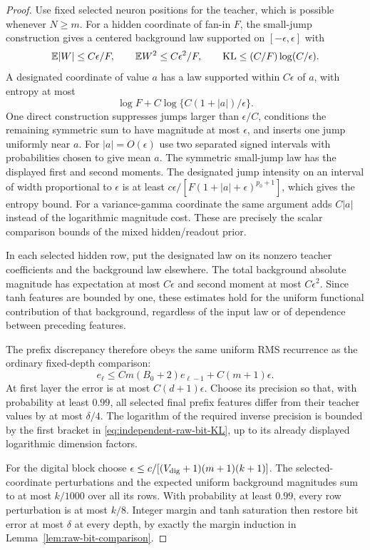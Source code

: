 \begin{proof}
Use fixed selected neuron positions for the teacher, which is
possible whenever $N\ge m$. For a hidden coordinate of fan-in $F$,
the small-jump construction gives a centered background law
supported on $[-\epsilon,\epsilon]$ with
\[
 \mathbb E|W|\le C\epsilon/F,\qquad
 \mathbb E W^2\le C\epsilon^2/F,\qquad
 \operatorname{KL}\le (C/F)\log(C/\epsilon).
\]
A designated coordinate of value $a$ has a law supported within
$C\epsilon$ of $a$, with entropy at most
\[
 \log F+C\log\{C(1+|a|)/\epsilon\}.
\]
One direct construction suppresses jumps larger than
$\epsilon/C$, conditions the remaining symmetric sum to have
magnitude at most $\epsilon$, and inserts one jump uniformly near
$a$. For $|a|=O(\epsilon)$ use two separated signed intervals with
probabilities chosen to give mean $a$. The symmetric small-jump
law has the displayed first and second moments. The designated
jump intensity on an interval of width proportional to $\epsilon$
is at least $c\epsilon/[F(1+|a|+\epsilon)^{p_0+1}]$, which gives
the entropy bound. For a variance-gamma coordinate the same
argument adds $C|a|$ instead of the logarithmic magnitude cost.
These are precisely the scalar comparison bounds of the mixed
hidden/readout prior.

In each selected hidden row, put the designated law on its
nonzero teacher coefficients and the background law elsewhere.
The total background absolute magnitude has expectation at most
$C\epsilon$ and second moment at most $C\epsilon^2$.
Since tanh features are bounded by one, these estimates hold for
the uniform functional contribution of that background, regardless
of the input law or of dependence between preceding features.

The prefix discrepancy therefore obeys the same uniform RMS
recurrence as the ordinary fixed-depth comparison:
\[
 e_\ell\le C m(B_0+2)e_{\ell-1}+C(m+1)\epsilon.
\]
At first layer the error is at most $C(d+1)\epsilon$.
Choose its precision so that, with probability at least $0.99$,
all selected final prefix features differ from their teacher
values by at most $\delta/4$.
The logarithm of the required inverse precision is bounded by
the first bracket in \eqref{eq:independent-raw-bit-KL},
up to its already displayed logarithmic dimension factors.

For the digital block choose
$\epsilon\le c/[(V_{\rm dig}+1)(m+1)(k+1)]$.
The selected-coordinate perturbations and the expected uniform
background magnitudes sum to at most $k/1000$ over all its rows.
With probability at least $0.99$, every row perturbation is at
most $k/8$. Integer margin and tanh saturation then restore
bit error at most $\delta$ at every depth, by exactly the
margin induction in Lemma~\ref{lem:raw-bit-comparison}.


\end{proof}
